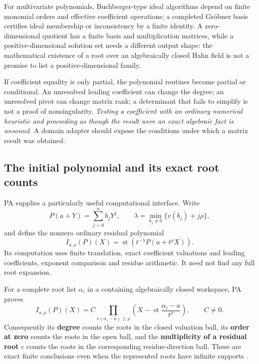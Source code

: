 \documentclass[11pt,letterpaper]{article}
\numberwithin{equation}{section}
\theoremstyle{definition}
\theoremstyle{remark}
\newcommand{\st}{\operatorname{st}}
\begin{document}
For multivariate polynomials, Buchberger-type ideal algorithms depend on finite
monomial orders and effective coefficient operations; a completed Gr\"obner
basis certifies ideal membership or inconsistency by a finite identity. A
zero-dimensional quotient has a finite basis and multiplication matrices, while
a positive-dimensional solution set needs a different output shape: the
mathematical existence of a root over an algebraically closed Hahn field is not
a promise to list a positive-dimensional family.

If coefficient equality is only partial, the polynomial routines become partial
or conditional. An unresolved leading coefficient can change the degree; an
unresolved pivot can change matrix rank; a determinant that fails to simplify is
not a proof of nonsingularity. \emph{Testing a coefficient with an ordinary
numerical heuristic and proceeding as though the result were an exact algebraic
fact is unsound.} A domain adapter should expose the conditions under which a
matrix result was obtained.

\subsection{The initial polynomial and its exact root counts}
\label{cas:sub-initial}
PA supplies a particularly useful computational interface. Write
\[
 P(a+Y)=\sum_{j=0}^n b_jY^j,\qquad
 \lambda=\min_{b_j\ne0}\{v(b_j)+j\rho\},
\]
and define the nonzero ordinary residual polynomial
\begin{equation}\label{cas:eq-initial}
 I_{a,\rho}(P)(X)=\st\!\left(t^{-\lambda}P(a+t^\rho X)\right).
\end{equation}
Its computation uses finite translation, exact coefficient valuations and
leading coefficients, exponent comparison and residue arithmetic. It need not
find any full root expansion.

For a complete root list $\alpha_i$ in a containing algebraically closed
workspace, PA proves
\begin{equation}\label{cas:eq-initialfactor}
 I_{a,\rho}(P)(X)=C\!\!\prod_{v(\alpha_i-a)\ge\rho}\!\!
 \left(X-\st\frac{\alpha_i-a}{t^\rho}\right),\qquad C\ne0 .
\end{equation}
Consequently its \textbf{degree} counts the roots in the closed valuation ball,
its \textbf{order at zero} counts the roots in the open ball, and the
\textbf{multiplicity of a residual root} $c$ counts the roots in the
corresponding residue-direction ball. These are exact finite conclusions even
when the represented roots have infinite supports \cite{cas:SourcePolynomial}.
\end{document}
